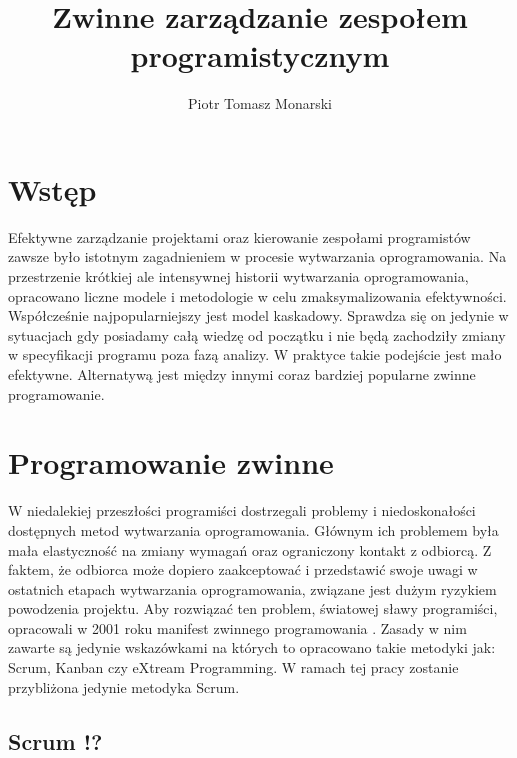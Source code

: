 


\title{Zwinne zarządzanie zespołem programistycznym}
\author{Piotr Tomasz Monarski}



\maketitle

\section{Wstęp}

Efektywne zarządzanie projektami oraz kierowanie zespołami programistów zawsze było istotnym zagadnieniem w procesie wytwarzania oprogramowania. Na przestrzenie krótkiej ale intensywnej historii wytwarzania oprogramowania, opracowano liczne modele i metodologie w celu zmaksymalizowania efektywności. Współcześnie najpopularniejszy jest model kaskadowy. Sprawdza się on jedynie w sytuacjach gdy posiadamy całą wiedzę od początku i nie będą zachodziły zmiany w specyfikacji programu poza fazą analizy. W praktyce takie podejście jest mało efektywne. Alternatywą jest między innymi coraz bardziej popularne zwinne programowanie. 

\section{Programowanie zwinne}

W niedalekiej przeszłości programiści dostrzegali problemy i niedoskonałości dostępnych metod wytwarzania oprogramowania. Głównym ich problemem była mała elastyczność na zmiany wymagań oraz ograniczony kontakt z odbiorcą. Z faktem, że odbiorca może dopiero zaakceptować i przedstawić swoje uwagi w ostatnich etapach wytwarzania oprogramowania, związane jest dużym ryzykiem powodzenia projektu. Aby rozwiązać ten problem, światowej sławy programiści, opracowali w 2001 roku manifest zwinnego programowania \cite{agile_manifesto}. Zasady w nim zawarte są jedynie wskazówkami na których to opracowano takie metodyki jak: Scrum, Kanban czy eXtream Programming. W ramach tej pracy zostanie przybliżona jedynie metodyka Scrum.

\subsection{Scrum !?}

